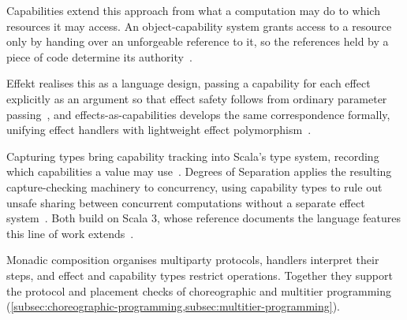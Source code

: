 Capabilities extend this approach from what a computation may do to which resources it may access.
%
An object-capability system grants access to a resource only by handing over an unforgeable reference to it,
so the references held by a piece of code determine its authority~\cite{miller2003capability}.

Effekt realises this as a language design,
passing a capability for each effect explicitly as an argument so that effect safety follows from ordinary parameter passing~\cite{brachthaeuser2020effekt},
and effects-as-capabilities develops the same correspondence formally,
unifying effect handlers with lightweight effect polymorphism~\cite{10.1145/3428194}.

Capturing types bring capability tracking into Scala's type system,
recording which capabilities a value may use~\cite{DBLP:journals/toplas/BoruchGruszeckiOLLB23}.
%
Degrees of Separation applies the resulting capture-checking machinery to concurrency,
using capability types to rule out unsafe sharing between concurrent computations without a separate effect system~\cite{DBLP:journals/pacmpl/XuBO24}.
%
Both build on Scala 3, whose reference documents the language features this line of work extends~\cite{odersky2021scala3}.

Monadic composition organises multiparty protocols,
handlers interpret their steps,
and effect and capability types restrict operations.
Together they support the protocol and placement checks of choreographic and multitier programming (\cref{subsec:choreographic-programming,subsec:multitier-programming}).
